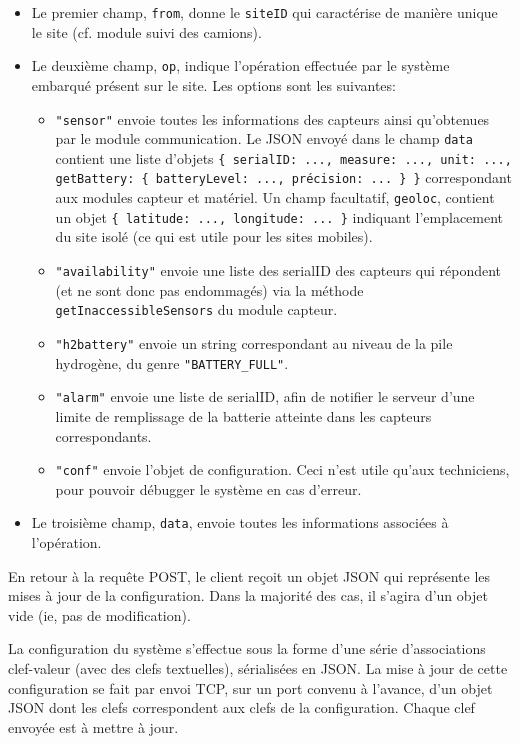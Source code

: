 \begin{itemize}
\item Le premier champ, \texttt{from}, donne le \texttt{siteID} qui caractérise de manière unique le site  (cf. module suivi des camions).
\item Le deuxième champ, \texttt{op}, indique l'opération effectuée par le système embarqué présent sur le site. Les options sont les suivantes:
\begin{itemize}
\item \texttt{"sensor"} envoie toutes les informations des capteurs ainsi qu'obtenues par le module communication. Le JSON envoyé dans le champ \texttt{data} contient une liste d'objets \texttt{\{ serialID: ..., measure: ..., unit: ..., getBattery: \{ batteryLevel: ..., précision: ... \} \}} correspondant aux modules capteur et matériel. Un champ facultatif, \texttt{geoloc}, contient un objet \texttt{\{ latitude: ..., longitude: ... \}} indiquant l'emplacement du site isolé (ce qui est utile pour les sites mobiles).
\item \texttt{"availability"} envoie une liste des serialID des capteurs qui répondent (et ne sont donc pas endommagés) via la méthode \texttt{getInaccessibleSensors} du module capteur.
\item \texttt{"h2battery"} envoie un string correspondant au niveau de la pile hydrogène, du genre \texttt{"BATTERY\_FULL"}.
\item \texttt{"alarm"} envoie une liste de serialID, afin de notifier le serveur d'une limite de remplissage de la batterie atteinte dans les capteurs correspondants.
\item \texttt{"conf"} envoie l'objet de configuration. Ceci n'est utile qu'aux techniciens, pour pouvoir débugger le système en cas d'erreur. 
\end{itemize}
\item Le troisième champ, \texttt{data}, envoie toutes les informations associées à l'opération.
\end{itemize}

En retour à la requête POST, le client reçoit un objet JSON qui représente les mises à jour de la configuration. Dans la majorité des cas, il s'agira d'un objet vide (ie, pas de modification).

La configuration du système s'effectue sous la forme d'une série d'associations clef-valeur (avec des clefs textuelles), sérialisées en JSON. La mise à jour de cette configuration se fait par envoi TCP, sur un port convenu à l'avance, d'un objet JSON dont les clefs correspondent aux clefs de la configuration. Chaque clef envoyée est à mettre à jour.

